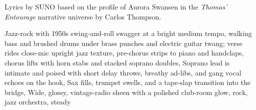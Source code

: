 
\begin{notes}
Lyrics by SUNO based on the profile of Aurora Swansen in the \emph{Thomas’ Entourage} narrative universe by Carlos Thompson.
\end{notes}
\begin{style}
Jazz-rock with 1950s swing-and-roll swagger at a bright medium tempo, walking bass and brushed drums under brass punches and electric guitar twang; verse rides close-mic upright jazz texture, pre-chorus strips to piano and handclaps, chorus lifts with horn stabs and stacked soprano doubles, Soprano lead is intimate and poised with short delay throws, breathy ad-libs, and gang vocal echoes on the hook, Sax fills, trumpet swells, and a tape-slap transition into the bridge, Wide, glossy, vintage-radio sheen with a polished club-room glow, rock, jazz orchestra, steady
\end{style}
